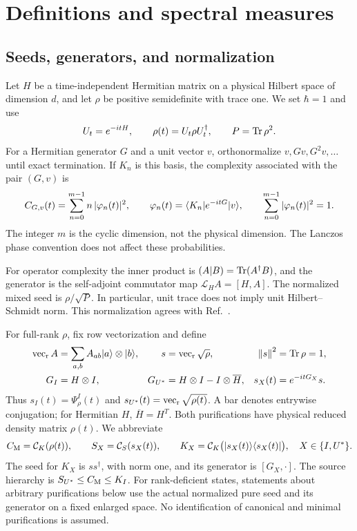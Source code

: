 \section{Definitions and spectral measures}\label{sec:framework}
\subsection{Seeds, generators, and normalization}
Let $H$ be a time-independent Hermitian matrix on a physical Hilbert space
of dimension $d$, and let $\rho$ be positive semidefinite with trace one.
We set $\hbar=1$ and use
\begin{equation}\label{eq:evolution}
 U_t=e^{-itH},\qquad \rho(t)=U_t\rho U_t^\dagger,
 \qquad P=\operatorname{Tr}\rho^2.
\end{equation}
For a Hermitian generator $G$ and a unit vector $v$, orthonormalize
$v,Gv,G^2v,\ldots$ until exact termination. If $K_n$ is this basis, the
complexity associated with the pair $(G,v)$ is
\begin{equation}\label{eq:general-complexity}
 C_{G,v}(t)=\sum_{n=0}^{m-1}n\,|\varphi_n(t)|^2,
 \qquad \varphi_n(t)=\langle K_n\rvert e^{-itG}\lvert v\rangle,
 \qquad \sum_{n=0}^{m-1}|\varphi_n(t)|^2=1.
\end{equation}
The integer $m$ is the cyclic dimension, not the physical dimension. The
Lanczos phase convention does not affect these probabilities.

For operator complexity the inner product is
$(A|B)=\operatorname{Tr}(A^\dagger B)$, and the generator is the self-adjoint
commutator map $\mathcal L_H A=[H,A]$. The normalized mixed seed is
$\rho/\sqrt P$. In particular, unit trace does not imply unit
Hilbert--Schmidt norm. This normalization agrees with
Ref.~\cite[Supplemental Eqs.~(S.7)--(S.11)]{DasMori2026}.

For full-rank $\rho$, fix row vectorization and define
\begin{equation}\label{eq:purification}
 \begin{aligned}
 \operatorname{vec}_{\mathrm r} A&=\sum_{a,b}A_{ab}\lvert a\rangle\otimes\lvert b\rangle,
 &s&=\operatorname{vec}_{\mathrm r}\sqrt\rho, &\left\lVert s\right\rVert^2&=\operatorname{Tr}\rho=1,\\
 G_I&=H\otimes I,
 &G_{U^*}&=H\otimes I-I\otimes\overline H,
 &s_X(t)&=e^{-itG_X}s .
 \end{aligned}
\end{equation}
Thus $s_I(t)=\Psi_\rho^I(t)$ and
$s_{U^*}(t)=\operatorname{vec}_{\mathrm r}\sqrt{\rho(t)}$. A bar denotes entrywise conjugation;
for Hermitian $H$, $\overline H=H^T$. Both purifications have physical
reduced density matrix $\rho(t)$. We abbreviate
\begin{equation}\label{eq:abbreviations}
 C_{\mathrm M}=\mathcal C_K(\rho(t)),\qquad
 S_X=\mathcal C_S(s_X(t)),\qquad
 K_X=\mathcal C_K\bigl(\lvert s_X(t)\rangle\langle s_X(t)\rvert\bigr),
 \quad X\in\{I,U^*\}.
\end{equation}
The seed for $K_X$ is $ss^\dagger$, with norm one, and its generator is
$[G_X,\cdot]$. The source hierarchy is $S_{U^*}\le C_{\mathrm M}\le K_I$.
For rank-deficient states, statements about arbitrary purifications below
use the actual normalized pure seed and its generator on a fixed enlarged
space. No identification of canonical and minimal purifications is assumed.

